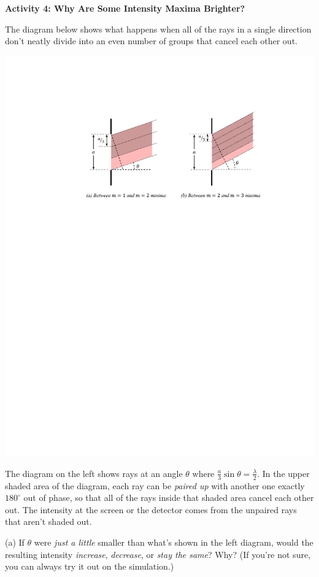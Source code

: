 \textbf{Activity 4: Why Are Some Intensity Maxima Brighter?}

The diagram below shows what happens when all of the rays in a single direction don't neatly divide into an even number of groups that cancel each other out.

{\centering \includegraphics{diffraction_of_light/diffraction_maxima_color.pdf} \par}

The diagram on the left shows rays at an angle $\theta$ where $\frac{a}{3} \sin \theta = \frac{\lambda}{2}$.  In the upper shaded area of the diagram, each ray can be \textit{paired up} with another one exactly $180^{\circ}$ out of phase, so that all of the rays inside that shaded area cancel each other out.  The intensity at the screen or the detector  comes from the unpaired rays that aren't shaded out.

(a) If $\theta$ were \textit{just a little} smaller than what's shown in the left diagram, would the resulting intensity \textit{increase}, \textit{decrease}, or \textit{stay the same}?  Why?  (If you're not sure, you can always try it out on the simulation.)
\answerspace{0.4in}

